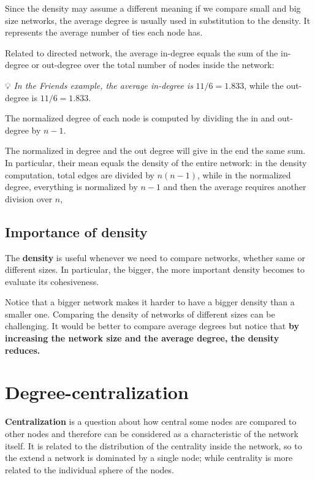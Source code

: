 \documentclass[
  notitlepage,
  onecolumn,
  openany]{book}
\begin{document}
Since the density may assume a different meaning if we compare small and big size networks, the average degree is usually used in substitution to the density. It represents the average number of ties each node has.

Related to directed network, the average in-degree equals the sum of the in-degree or out-degree over the total number of nodes inside the network:

💡 \emph{In the Friends example, the average in-degree is} \(11/6 = 1.833\), while the out-degree is \(11/6 = 1.833\).

The normalized degree of each node is computed by dividing the in and out-degree by \(n-1\).

The normalized in degree and the out degree will give in the end the same sum. In particular, their mean equals the density of the entire network: in the density computation, total edges are divided by \(n(n-1)\), while in the normalized degree, everything is normalized by \(n-1\) and then the average requires another division over \(n\),

\hypertarget{importance-of-density}{%
\subsection{Importance of density}\label{importance-of-density}}

The \textbf{density} is useful whenever we need to compare networks, whether same or different sizes. In particular, the bigger, the more important density becomes to evaluate its cohesiveness.

Notice that a bigger network makes it harder to have a bigger density than a smaller one. Comparing the density of networks of different sizes can be challenging. It would be better to compare average degrees but notice that \textbf{by increasing the network size and the average degree, the density reduces.}

\hypertarget{degree-centralization}{%
\section{Degree-centralization}\label{degree-centralization}}

\textbf{Centralization} is a question about how central some nodes are compared to other nodes and therefore can be considered as a characteristic of the network itself. It is related to the distribution of the centrality inside the network, so to the extend a network is dominated by a single node; while centrality is more related to the individual sphere of the nodes.
\end{document}
